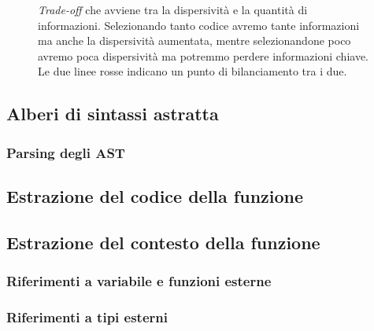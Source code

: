 \begin{figure}[h]
  \centering
  \caption{\textit{Trade-off} che avviene tra la dispersività e la quantità di informazioni. Selezionando tanto codice avremo tante informazioni ma anche la dispersività aumentata, mentre selezionandone poco avremo poca dispersività ma potremmo perdere informazioni chiave.
    Le due linee rosse indicano un punto di bilanciamento tra i due.
  }
  \label{fig:trade_off}
\end{figure}

\subsection{Alberi di sintassi astratta}

\subsubsection{Parsing degli AST}


\subsection{Estrazione del codice della funzione}


\subsection{Estrazione del contesto della funzione}

\subsubsection{Riferimenti a variabile e funzioni esterne}

\subsubsection{Riferimenti a tipi esterni}


